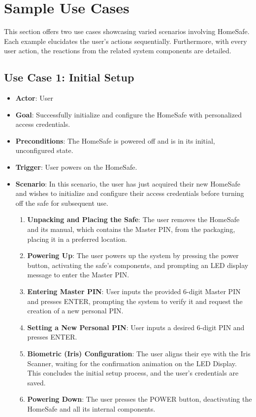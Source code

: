 \documentclass{article}
\begin{document}
\section{Sample Use Cases}
This section offers two use cases showcasing varied scenarios involving HomeSafe. Each example elucidates the user's actions sequentially. Furthermore, with every user action, the reactions from the related system components are detailed.

\subsection{Use Case 1: Initial Setup}
\begin{itemize}
    \item \textbf{Actor}: User
    \item \textbf{Goal}: Successfully initialize and configure the HomeSafe with personalized access credentials.
    \item \textbf{Preconditions}: The HomeSafe is powered off and is in its initial, unconfigured state.
    \item \textbf{Trigger}: User powers on the HomeSafe.
    \item \textbf{Scenario}: In this scenario, the user has just acquired their new HomeSafe and wishes to initialize and configure their access credentials before turning off the safe for subsequent use.
    \begin{enumerate}
    \item \textbf{Unpacking and Placing the Safe}: The user removes the HomeSafe and its manual, which contains the Master PIN, from the packaging, placing it in a preferred location.
    \item \textbf{Powering Up}: The user powers up the system by pressing the power button, activating the safe's components, and prompting an LED display message to enter the Master PIN.
    \item \textbf{Entering Master PIN}: User inputs the provided 6-digit Master PIN and presses ENTER, prompting the system to verify it and request the creation of a new personal PIN.
    \item \textbf{Setting a New Personal PIN}: User inputs a desired 6-digit PIN and presses ENTER.
    \item \textbf{Biometric (Iris) Configuration}: The user aligns their eye with the Iris Scanner, waiting for the confirmation animation on the LED Display. This concludes the initial setup process, and the user's credentials are saved.
    \item \textbf{Powering Down}: The user presses the POWER button, deactivating the HomeSafe and all its internal components.
    \end{enumerate}
\end{itemize}
\end{document}
